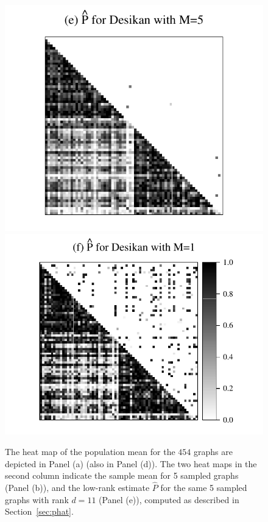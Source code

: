 \documentclass[journal,twoside,web]{ieeecolor}
\begin{document}
\begin{figure}[!tbp]
\includegraphics[height=.11025\textheight]{Phat_desikan_m5.pdf} \hspace{-24pt}
\includegraphics[height=.11025\textheight]{Phat_desikan_m1.pdf}
\caption{
The heat map of the population mean for the $454$ graphs are depicted in Panel (a) (also in Panel (d)).
The two heat maps in the second column indicate the sample mean for 5 sampled graphs (Panel (b)), and the low-rank estimate $\hat{P}$ for the same 5 sampled graphs with rank $d=11$ (Panel (e)), computed as described in Section~\ref{sec:phat}.
}
\end{figure}
\end{document}
